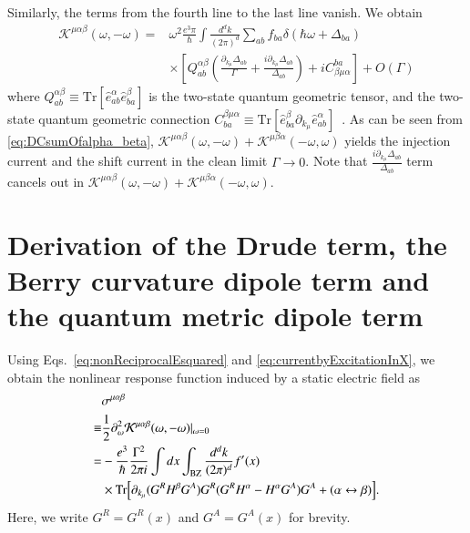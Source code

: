 \documentclass[twocolumn,superscriptaddress]{revtex4-1}
\newcommand{\smrm}[1]{_{\mathrm{#1}}}
\begin{document}
Similarly, the terms from the fourth line to the last line vanish.
We obtain
\begin{align}
 \mathcal{K}^{\mu\alpha\beta}(\omega,-\omega)=&\omega^2\frac{e^3\pi}{\hbar}\int \frac{d^d k}{(2\pi)^d} \sum_{ab}f_{ba}\delta(\hbar\omega+\Delta_{ba}) \nonumber \\
  &\times \left[Q_{ab}^{\alpha\beta}\left(\frac{\partial_{k_\mu} \Delta_{ab}}{\Gamma}+\frac{i\partial_{k_\mu} \Delta_{ab}}{\Delta_{ab}}\right)+iC_{\beta\mu\alpha}^{ba}\right]+O(\Gamma) \label{eq:halfPhotocurrent}
\end{align}
where $Q_{ab}^{\alpha\beta}\equiv\mathrm{Tr}[\hat{e}_{ab}^\alpha \hat{e}_{ba}^\beta]$ is the two-state quantum geometric tensor, and the two-state quantum geometric connection $C_{ba}^{\beta\mu\alpha}\equiv\mathrm{Tr}[\hat{e}_{ba}^\beta \partial_{k_\mu} \hat{e}_{ab}^\alpha]$~\cite{Ahn2022,Johannes2025}.
As can be seen from \eqref{eq:DCsumOfalpha_beta}, $\mathcal{K}^{\mu\alpha\beta}(\omega,-\omega)+\mathcal{K}^{\mu\beta\alpha}(-\omega,\omega)$ yields the injection current and the shift current in the clean limit $\Gamma \to 0$.
Note that $\frac{i\partial_{k_\mu} \Delta_{ab}}{\Delta_{ab}}$ term cancels out in $\mathcal{K}^{\mu\alpha\beta}(\omega,-\omega)+\mathcal{K}^{\mu\beta\alpha}(-\omega,\omega)$.


\section{Derivation of the Drude term, the Berry curvature dipole term and the quantum metric dipole term} \label{app:DrudeBCD}
Using Eqs.~\eqref{eq:nonReciprocalEsquared} and \eqref{eq:currentbyExcitationInX}, we obtain the nonlinear response function induced by a static electric field as
\begin{align}
  &\sigma^{\mu\alpha\beta}\nonumber \\
  \equiv &\frac{1}{2}\partial_\omega^2\mathcal{K}^{\mu\alpha\beta}(\omega,-\omega)|_{\omega=0}\nonumber \\
  =&-\frac{e^3}{\hbar}\frac{\Gamma^2}{2\pi i}\int dx \int\smrm{BZ} \frac{d^d k}{(2\pi)^d} f'(x) \nonumber \\
  &\times \Tr[\partial_{k_\mu} (G^R H^\beta G^A) G^R (G^R H^\alpha -H^\alpha G^A) G^A +(\alpha \leftrightarrow \beta)].\label{eq:sigmaMuAlphaBetaGreenFunction}
\end{align}
Here, we write $G^R=G^R(x)$ and $G^A=G^A(x)$ for brevity.
\end{document}
